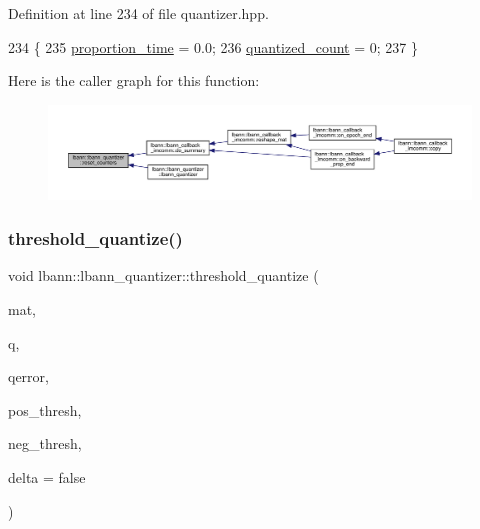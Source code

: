 Definition at line 234 of file quantizer.\+hpp.


\begin{DoxyCode}
234                         \{
235     \hyperlink{classlbann_1_1lbann__quantizer_a6bd266728f578df0c86fc2e493742cc1}{proportion\_time} = 0.0;
236     \hyperlink{classlbann_1_1lbann__quantizer_a716fae78ef5ba082a8093f0d06550804}{quantized\_count} = 0;
237   \}
\end{DoxyCode}
Here is the caller graph for this function\+:\nopagebreak
\begin{figure}[H]
\begin{center}
\leavevmode
\includegraphics[width=350pt]{classlbann_1_1lbann__quantizer_aee1ea46e3191ad25fd310938eaf5a2e0_icgraph}
\end{center}
\end{figure}
\mbox{\label{classlbann_1_1lbann__quantizer_a00106e69ea8a6dfe9e9a91c75b845bcd}} 
\subsubsection{\texorpdfstring{threshold\+\_\+quantize()}{threshold\_quantize()}\hspace{0.1cm}{\footnotesize\ttfamily [1/2]}}
{\footnotesize\ttfamily void lbann\+::lbann\+\_\+quantizer\+::threshold\+\_\+quantize (\begin{DoxyParamCaption}\item[{const \hyperlink{base_8hpp_a68f11fdc31b62516cb310831bbe54d73}{Mat} \&}]{mat,  }\item[{\hyperlink{classlbann_1_1lbann__quantizer_a85ea8e298c2975b4f802855278406aa7}{Thresh\+Quantized} \&}]{q,  }\item[{\hyperlink{base_8hpp_a68f11fdc31b62516cb310831bbe54d73}{Mat} \&}]{qerror,  }\item[{Data\+Type}]{pos\+\_\+thresh,  }\item[{Data\+Type}]{neg\+\_\+thresh,  }\item[{bool}]{delta = {\ttfamily false} }\end{DoxyParamCaption})}

